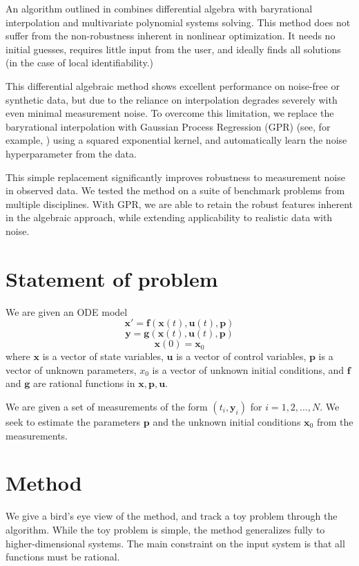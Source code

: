 \documentclass{ifacconf}
\begin{document}
	An algorithm outlined in \citep{bassik2023robustparameterestimationrational} combines differential algebra with baryrational interpolation and multivariate polynomial systems  solving.  This method does not suffer from the non-robustness inherent in nonlinear optimization.  It needs no initial guesses, requires little input from the user, and ideally finds all solutions (in the case of local identifiability.)  
	
	This differential algebraic method shows excellent performance on noise-free or synthetic data, but due to the reliance on interpolation degrades severely with even minimal measurement noise. To overcome this limitation, we replace the baryrational interpolation with Gaussian Process Regression (GPR) (see, for example, \cite{Rasmussen2006Gaussian}) using a squared exponential kernel, and automatically learn the noise hyperparameter from the data.  
	
	This simple replacement significantly improves robustness to measurement noise in observed data.  We tested the method on a suite of benchmark problems from multiple disciplines.  With GPR, we are able to retain the robust features inherent in the algebraic approach, while extending applicability to realistic data with noise.
	
	\section{Statement of problem}
	We are given an ODE model
	\[ \mathbf{x}' = \mathbf{f}(\mathbf{x}(t), \mathbf{u}(t), \mathbf{p})\]
\[ \mathbf{y} = \mathbf{g}(\mathbf{x}(t), \mathbf{u}(t), \mathbf{p})\]
\[ \mathbf{x}(0) = \mathbf{x}_0\]
	where $\mathbf{x}$ is a vector of state variables, $\mathbf{u}$ is a vector of  control variables, $\mathbf{p}$ is a vector of  unknown parameters, $x_0$ is a vector of  unknown initial conditions, and $\mathbf{f}$ and $\mathbf{g}$ are rational functions {in $\mathbf{x},\mathbf{p}, \mathbf{u}$}.  
	
	We are given a set of measurements of the form $(t_i, \mathbf{y}_i)$ for $i = 1, 2, \ldots, N$.  We seek to estimate the parameters $\mathbf{p}$ and the unknown initial conditions $\mathbf{x}_0$ from the measurements.  
	
	\section{Method}
	We give a bird's eye view of the method, and track a toy problem through the algorithm.  While the toy problem is simple, the method generalizes fully to higher-dimensional systems.  The main constraint on the input system is that all functions must be rational.
\end{document}
